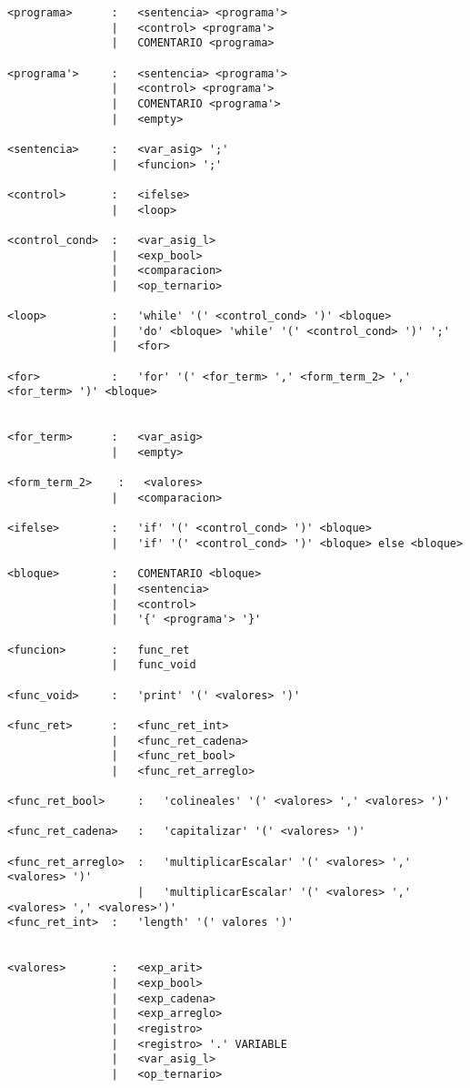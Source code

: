 \begin{verbatim}
<programa>      :   <sentencia> <programa'>   
                |   <control> <programa'>   
                |   COMENTARIO <programa>   

<programa'>     :   <sentencia> <programa'>   
                |   <control> <programa'>   
                |   COMENTARIO <programa'>   
                |   <empty>

<sentencia>     :   <var_asig> ';'
                |   <funcion> ';'

<control>       :   <ifelse>
                |   <loop>

<control_cond>  :   <var_asig_l>
                |   <exp_bool>
                |   <comparacion>
                |   <op_ternario>

<loop>          :   'while' '(' <control_cond> ')' <bloque>
                |   'do' <bloque> 'while' '(' <control_cond> ')' ';' 
                |   <for>
                
<for>           :   'for' '(' <for_term> ',' <form_term_2> ',' <for_term> ')' <bloque>


<for_term>      :   <var_asig> 
                |   <empty>

<form_term_2>    :   <valores>
                |   <comparacion>

<ifelse>        :   'if' '(' <control_cond> ')' <bloque>
                |   'if' '(' <control_cond> ')' <bloque> else <bloque>

<bloque>        :   COMENTARIO <bloque>
                |   <sentencia>
                |   <control>
                |   '{' <programa'> '}'

<funcion>       :   func_ret
                |   func_void

<func_void>     :   'print' '(' <valores> ')'

<func_ret>      :   <func_ret_int>
                |   <func_ret_cadena>
                |   <func_ret_bool>
                |   <func_ret_arreglo>

<func_ret_bool>     :   'colineales' '(' <valores> ',' <valores> ')'

<func_ret_cadena>   :   'capitalizar' '(' <valores> ')'

<func_ret_arreglo>  :   'multiplicarEscalar' '(' <valores> ',' <valores> ')'
                    |   'multiplicarEscalar' '(' <valores> ',' <valores> ',' <valores>')'
<func_ret_int>  :   'length' '(' valores ')'


<valores>       :   <exp_arit>
                |   <exp_bool>
                |   <exp_cadena>
                |   <exp_arreglo>
                |   <registro>
                |   <registro> '.' VARIABLE
                |   <var_asig_l>
                |   <op_ternario>


\end{verbatim}

